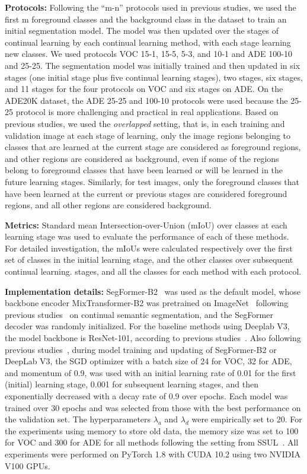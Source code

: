 \documentclass[onecolumn,conference,compsoc]{IEEEtran}
\begin{document}
\begin{spacing}{1.5}
\noindent\textbf{Protocols:} Following the “m-n” protocols used in previous studies, we used the first m foreground classes and the background class in the dataset to train an initial segmentation model. {The model was then} updated over the stages of continual learning by each continual learning method, with each stage learning new classes. We used protocols VOC 15-1, 15-5, 5-3, and 10-1 and ADE 100-10 and 25-25. The segmentation model was initially trained and then updated in six stages (one initial stage plus five continual learning stages), two stages, six stages, and 11 stages for the four protocols on VOC and six stages on ADE. On the ADE20K dataset, the ADE 25-25 {and 100-10 protocols were used because} the 25-25 protocol is more challenging and practical in real applications. {Based on} previous studies, we used the {\textit{overlapped}} setting, {that is,} in each training and validation image at each stage of learning, only the image regions belonging to classes that are learned at the current stage are considered as foreground regions, and other regions are considered as background, even if some of the regions belong to foreground classes that have been learned or will be learned in the future learning stages. Similarly, for test images, only the foreground classes that have been learned at the current or previous stages are considered foreground regions, and all other regions are considered background.


\noindent\textbf{Metrics:} Standard mean Intersection-over-Union (mIoU) over classes at each learning stage was used to evaluate the performance of each {of these methods.} For detailed investigation, the mIoUs were calculated respectively over the first set of classes in the initial learning stage, and the other classes over subsequent continual learning. stages, and all the classes for each method with each protocol.

\noindent\textbf{Implementation details:} SegFormer-B2~\cite{SegFormer} was used as the default model, whose backbone encoder MixTransformer-B2 was pretrained on ImageNet~\cite{ImageNet} following previous studies~\cite{ILT,MiB,PLOP,SDR,SSUL} on continual semantic segmentation, and the SegFormer decoder was randomly initialized. For the baseline methods {using} Deeplab V3, the model backbone is ResNet-101, {according to} previous studies~\cite{MiB, PLOP}. Also following previous studies~\cite{MiB,PLOP}, during model training and updating of SegFormer-B2 or DeepLab V3, the SGD optimizer with a batch size of 24 for VOC, 32 for ADE, and momentum of 0.9, was used with an initial learning rate of 0.01 for the first (initial) learning stage, 0.001 for subsequent learning stages, and then exponentially decreased with a decay rate of 0.9 over epochs. Each model was trained over 30 epochs and was selected from those with the best performance on the validation set. The hyperparameters $\lambda_a$ and $\lambda_{d}$ were empirically set to 20. For the experiments using memory to store old data, the memory size was set to 100 for VOC and 300 for ADE for all methods following the setting from SSUL~\cite{SSUL}. All experiments were {performed} on PyTorch 1.8 with CUDA 10.2 using two NVIDIA V100 GPUs.




\end{spacing}
\end{document}
